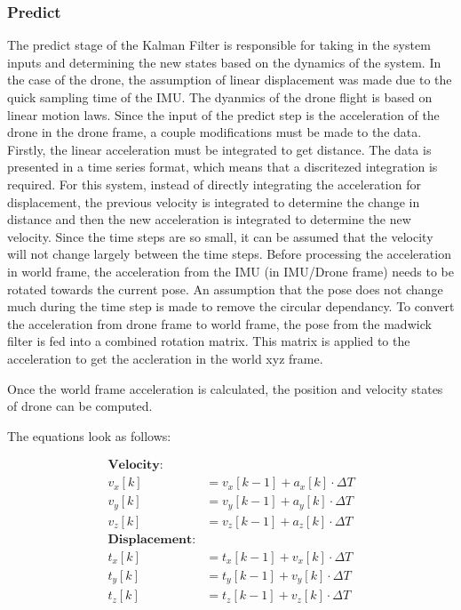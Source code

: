\documentclass[bare_jrnl_transmag]{subfiles}
\begin{document}
\subsubsection{Predict}
The predict stage of the Kalman Filter is responsible for taking in the system inputs and determining the new states based on the dynamics of the system. In the case of the drone, the assumption of linear displacement was made due to the quick sampling time of the IMU. The dyanmics of the drone flight is based on linear motion laws. Since the input of the predict step is the acceleration of the drone in the drone frame, a couple modifications must be made to the data. Firstly, the linear acceleration must be integrated to get distance. The data is presented in a time series format, which means that a discritezed integration is required. For this system, instead of directly integrating the acceleration for displacement, the previous velocity is integrated to determine the change in distance and then the new acceleration is integrated to determine the new velocity. Since the time steps are so small, it can be assumed that the velocity will not change largely between the time steps. 
Before processing the acceleration in world frame, the acceleration from the IMU (in IMU/Drone frame) needs to be rotated towards the current pose. An assumption that the pose does not change much during the time step is made to remove the circular dependancy. To convert the acceleration from drone frame to world frame, the pose from the madwick filter is fed into a combined rotation matrix. This matrix is applied to the acceleration to get the accleration in the world xyz frame.

Once the world frame acceleration is calculated, the position and velocity states of drone can be computed.

The equations look as follows:

\begin{align*}
    \textbf{Velocity:} \\
    v_x[k] &= v_x[k-1] + a_x[k] \cdot \Delta T \\
    v_y[k] &= v_y[k-1] + a_y[k] \cdot \Delta T \\
    v_z[k] &= v_z[k-1] + a_z[k] \cdot \Delta T
\\
    \textbf{Displacement:} \\
    t_x[k] &= t_x[k-1] + v_x[k] \cdot \Delta T \\
    t_y[k] &= t_y[k-1] + v_y[k] \cdot \Delta T \\
    t_z[k] &= t_z[k-1] + v_z[k] \cdot \Delta T
\end{align*}
    
\end{document}
